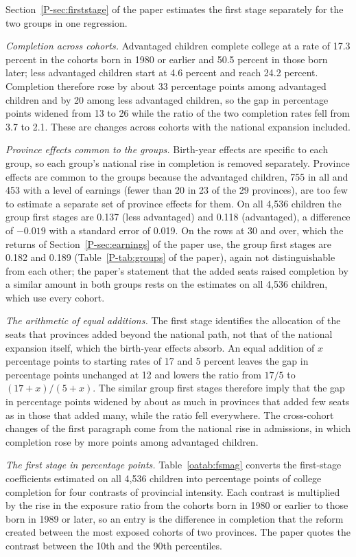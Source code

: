 \documentclass[11pt]{article}
\numberwithin{equation}{section}
\begin{document}
Section~\ref{P-sec:firststage} of the paper estimates the first stage separately for the two groups in one regression.

\emph{Completion across cohorts.} Advantaged children complete college at a rate of 17.3 percent in the cohorts born in 1980 or earlier and 50.5 percent in those born later; less advantaged children start at 4.6 percent and reach 24.2 percent. Completion therefore rose by about 33 percentage points among advantaged children and by 20 among less advantaged children, so the gap in percentage points widened from 13 to 26 while the ratio of the two completion rates fell from 3.7 to 2.1. These are changes across cohorts with the national expansion included.

\emph{Province effects common to the groups.} Birth-year effects are specific to each group, so each group's national rise in completion is removed separately. Province effects are common to the groups because the advantaged children, 755 in all and 453 with a level of earnings (fewer than 20 in 23 of the 29 provinces), are too few to estimate a separate set of province effects for them. On all 4,536 children the group first stages are 0.137 (less advantaged) and 0.118 (advantaged), a difference of $-0.019$ with a standard error of 0.019.  On the rows at 30 and over, which the returns of Section~\ref{P-sec:earnings} of the paper use, the group first stages are 0.182 and 0.189 (Table~\ref{P-tab:groups} of the paper), again not distinguishable from each other; the paper's statement that the added seats raised completion by a similar amount in both groups rests on the estimates on all 4,536 children, which use every cohort.

\emph{The arithmetic of equal additions.} The first stage identifies the allocation of the seats that provinces added beyond the national path, not that of the national expansion itself, which the birth-year effects absorb. An equal addition of $x$ percentage points to starting rates of 17 and 5 percent leaves the gap in percentage points unchanged at 12 and lowers the ratio from $17/5$ to $(17 + x)/(5 + x)$. The similar group first stages therefore imply that the gap in percentage points widened by about as much in provinces that added few seats as in those that added many, while the ratio fell everywhere. The cross-cohort changes of the first paragraph come from the national rise in admissions, in which completion rose by more points among advantaged children.

\emph{The first stage in percentage points.} Table~\ref{oatab:fsmag} converts the first-stage coefficients estimated on all 4,536 children into percentage points of college completion for four contrasts of provincial intensity. Each contrast is multiplied by the rise in the exposure ratio from the cohorts born in 1980 or earlier to those born in 1989 or later, so an entry is the difference in completion that the reform created between the most exposed cohorts of two provinces. The paper quotes the contrast between the 10th and the 90th percentiles.
\end{document}
